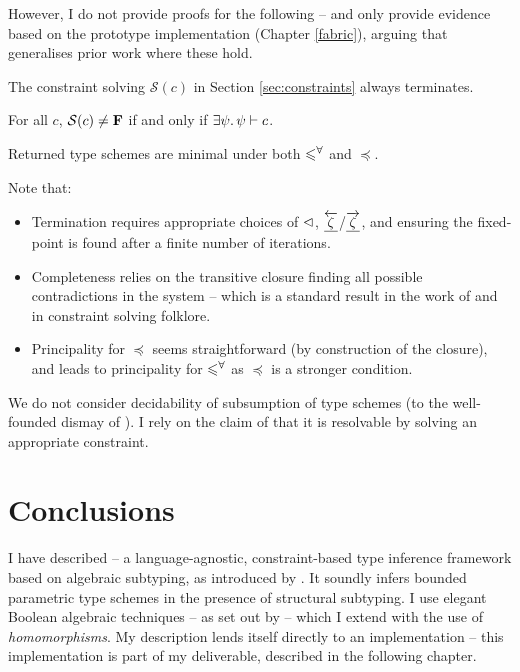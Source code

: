 However, I do not provide proofs for the following -- and only provide evidence based on the prototype implementation (Chapter \ref{fabric}), arguing that \inference{} generalises prior work where these hold. 

\begin{conjecture}[Termination]
    The constraint solving $\mathcal S(c)$ in Section \ref{sec:constraints} always terminates.
\end{conjecture}

\begin{conjecture}[Completeness]    
    For all $c$, $\mathcal S(c) \ne \mathbf F$ if and only if $\exists \psi \ldotp \psi \vdash c$.
\end{conjecture}

\begin{conjecture}[Principality]
    Returned type schemes are minimal under both $\leqslant^\forall$ and $\preceq$.
\end{conjecture}

Note that: \begin{itemize}
    \item Termination requires appropriate choices of $\lhd$, $\underline{\overleftarrow{\zeta}}$/$\underline{\overrightarrow{\zeta}}$, and ensuring the fixed-point is found after a finite number of iterations.
    \item Completeness relies on the transitive closure finding all possible contradictions in the system -- which is a standard result in the work of \textcite{pottier-framework} and in constraint solving folklore.
    \item Principality for $\preceq$ seems straightforward (by construction of the closure), and leads to principality for $\leqslant^\forall$ as $\preceq$ is a stronger condition.
\end{itemize}
We do not consider decidability of subsumption of type schemes (to the well-founded dismay of \textcite{dolan-thesis}). I rely on the claim of \textcite{mlstruct} that it is resolvable by solving an appropriate constraint.

\section{Conclusions}
\label{sec:conclusions}

I have described \inference{} -- a language-agnostic, constraint-based type inference framework based on algebraic subtyping, as introduced by \textcite{mlsub}.
It soundly infers bounded parametric type schemes in the presence of structural subtyping. 
I use elegant Boolean algebraic techniques -- as set out by \textcite{mlstruct} -- which I extend with the use of \emph{homomorphisms}. 
My description lends itself directly to an implementation -- this implementation is part of my deliverable, described in the following chapter.


